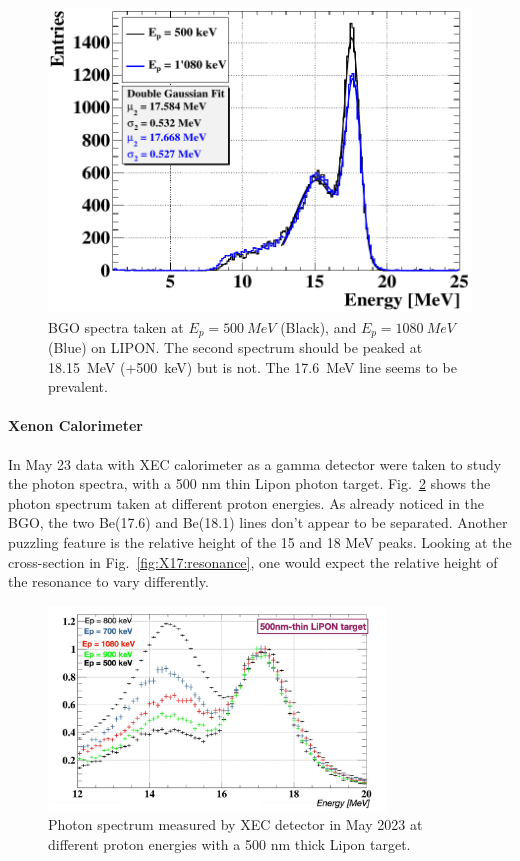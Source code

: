 \begin{refsection}
        \begin{figure}
            \centering
            \includegraphics[width=0.9\linewidth]{Figures//X17//BGO/BGO_500vs1080.png}
            \caption{BGO spectra taken at $E_p=\SI{500}{MeV}$ (Black), and $E_p=\SI{1080}{MeV}$ (Blue) on LIPON. The second spectrum should be peaked at \SI{18.15}{MeV} (+\SI{500}{keV}) but is not. The \SI{17.6}{MeV} line seems to be prevalent.}
            \label{fig:BGO:500vs1080}
        \end{figure}

        
        \paragraph{Xenon Calorimeter} 
        In May 23 data with XEC calorimeter as a gamma detector were taken to study the photon spectra, with a 500 nm thin Lipon photon target.
        Fig.~\ref{fig:xecspectrum} shows the photon spectrum taken at different proton energies. As already noticed in the BGO, the two Be(17.6) and Be(18.1) lines don't appear to be separated.
        Another puzzling feature is the relative height of the 15 and 18 MeV peaks.
        Looking at the cross-section in Fig.~\ref{fig:X17:resonance}, one would expect the relative height of the resonance to vary differently.
        
        \begin{figure}[]
            \centering
            \includegraphics[width = 0.8\textwidth]{Figures/X17/X17_XEC_2023.pdf}
            \caption[X17: XEC data in May 2023]{Photon spectrum measured by XEC detector in May 2023 at different proton energies with a 500 nm thick Lipon target.}
            \label{fig:xecspectrum}
        \end{figure}


\end{refsection}
